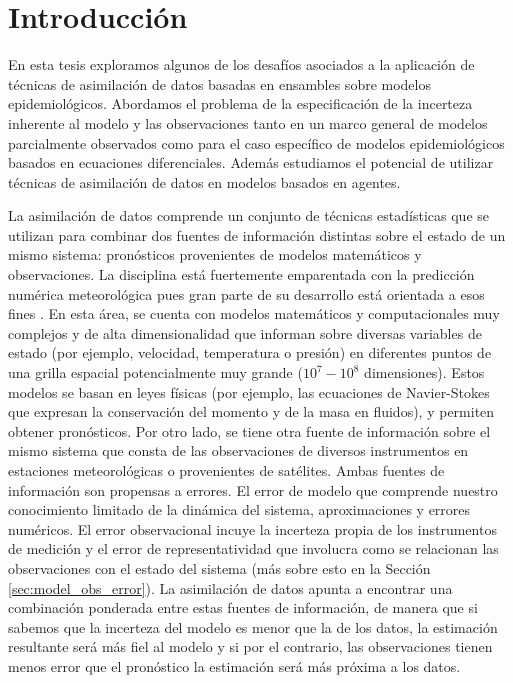 \chapter{Introducción}
En esta tesis exploramos algunos de los desafíos asociados a la aplicación de técnicas de asimilación de datos basadas en ensambles sobre modelos epidemiológicos. Abordamos el problema de la especificación de la incerteza inherente al modelo y las observaciones tanto en un marco general de modelos parcialmente observados como para el caso específico de modelos epidemiológicos basados en ecuaciones diferenciales. Además estudiamos el potencial de utilizar técnicas de asimilación de datos en modelos basados en agentes.

La asimilación de datos comprende un conjunto de técnicas estadísticas que se utilizan para combinar dos fuentes de información distintas sobre el estado de un mismo sistema: pronósticos provenientes de modelos matemáticos y observaciones. La disciplina está fuertemente emparentada con la predicción numérica meteorológica pues gran parte de su desarrollo está orientada a esos fines \citep{Talagrand1987}. En esta área, se cuenta con modelos matemáticos y computacionales muy complejos y de alta dimensionalidad que informan sobre diversas variables de estado (por ejemplo, velocidad, temperatura o presión) en diferentes puntos de una grilla espacial potencialmente muy grande ($10^7 - 10^8$ dimensiones). Estos modelos se basan en leyes físicas (por ejemplo, las ecuaciones de Navier-Stokes que expresan la conservación del momento y de la masa en fluidos), y permiten obtener pronósticos. Por otro lado, se tiene otra fuente de información sobre el mismo sistema que consta de las observaciones de diversos instrumentos en estaciones meteorológicas o provenientes de satélites. Ambas fuentes de información son propensas a errores. El error de modelo que comprende nuestro conocimiento limitado de la dinámica del sistema, aproximaciones y errores numéricos. El error observacional incuye la incerteza propia de los instrumentos de medición y el error de representatividad que involucra como se relacionan las observaciones con el estado del sistema (más sobre esto en la Sección \ref{sec:model_obs_error}). La asimilación de datos apunta a encontrar una combinación ponderada entre estas fuentes de información, de manera que si sabemos que la incerteza del modelo es menor que la de los datos, la estimación resultante será más fiel al modelo y si por el contrario, las observaciones tienen menos error que el pronóstico la estimación será más próxima a los datos.

